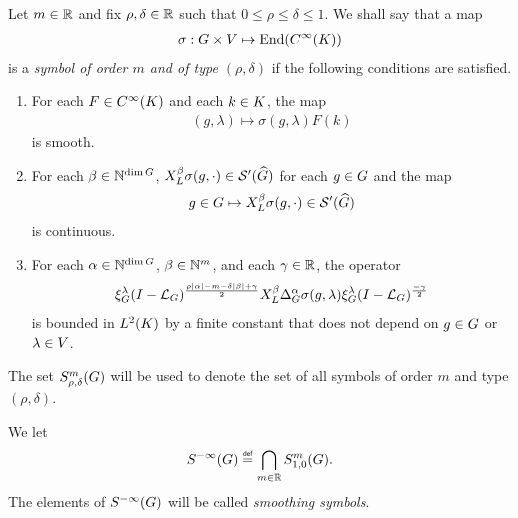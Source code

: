 \begin{definition}
\label{definition:symbol_classes}
    Let $m \in \mathbb{R}$ and fix $\rho, \delta \in \mathbb{R}$ such that $0 \leq \rho \leq \delta \leq 1$.
    We shall say that a map
    \begin{align*}
        \sigma : G \times V \mapsto \operatorname{End}({C^\infty(K)})
    \end{align*}
    is a \emph{symbol of order $m$ and of type $(\rho, \delta)$} if the following conditions are satisfied.
    \begin{enumerate}
        \item
            For each $F \in {C^\infty(K)}$ and each $k \in K$,
            the map
            \begin{align*}
                (g, \lambda) \mapsto \sigma(g, \lambda) F(k)
            \end{align*}
            is smooth.
        \item
            For each $\beta \in \mathbb{N}^{\dim G}$,
            $X^{\beta}_L \sigma(g, \cdot) \in {\mathcal{S}' ({\widehat{G}})}$
            for each $g \in G$ and the map
            \begin{align*}
                g \in G \mapsto X^{\beta}_L \sigma(g, \cdot) \in {\mathcal{S}' ({\widehat{G}})}
            \end{align*}
            is continuous.
        \item
            For each $\alpha \in \mathbb{N}^{\dim G}$, $\beta \in \mathbb{N}^m$, and each $\gamma \in \mathbb{R}$,
            the operator
            \begin{align*}
                \xi^{\lambda}_{G} {(I - {\mathcal{L}_{G}})^\frac{\rho \left|{\alpha}\right| - m - \delta \left|{\beta}\right| + \gamma}{2}} X^{\beta}_L {\Delta_{G}^{\alpha}} \sigma(g, \lambda) \xi^{\lambda}_{G} {(I - {\mathcal{L}_{G}})^\frac{-\gamma}{2}}
            \end{align*}
            is bounded in ${L^{2} (K)}$ by a finite constant that does not depend on $g \in G$ or $\lambda \in V$.
    \end{enumerate}

    The set $S^{m}_{\rho, \delta}(G)$ will be used to denote the set of all symbols of order $m$ and type $(\rho, \delta)$.
\end{definition}

\begin{definition}
\label{definition:smoothing_symbols}
    We let
    \begin{align*}
        \SmoothingSymbols \defeq \bigcap_{m \in \R} \SymbolClass{m}{1, 0}.
    \end{align*}
    The elements of ${S^{-\infty} (G)}$ will be called \emph{smoothing symbols}.
\end{definition}

